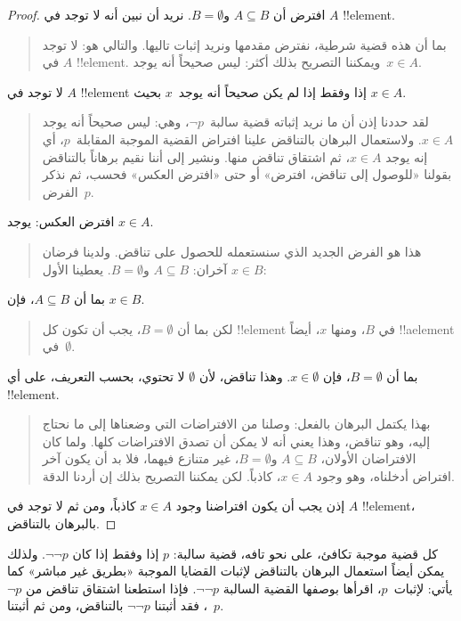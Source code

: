 \documentclass[../../../include/open-logic-section]{subfiles}
\begin{document}
\begin{proof}
  افترض أن $A \subseteq B$ و$B = \emptyset$. نريد أن نبين أنه لا توجد
  في $A$ !!{element}.
  \begin{quote}
    بما أن هذه قضية شرطية، نفترض مقدمها ونريد إثبات تاليها. والتالي هو:
    لا توجد في $A$ !!{element}. ويمكننا التصريح بذلك أكثر: ليس صحيحاً
    أنه يوجد~$x \in A$.
  \end{quote}
  لا توجد في $A$ !!{element} إذا وفقط إذا لم يكن صحيحاً أنه يوجد~$x$
  بحيث $x \in A$.
  \begin{quote}
    لقد حددنا إذن أن ما نريد إثباته قضية سالبة~$\lnot p$، وهي: ليس
    صحيحاً أنه يوجد $x \in A$. ولاستعمال البرهان بالتناقض علينا افتراض
    القضية الموجبة المقابلة~$p$، أي إنه يوجد $x \in A$، ثم اشتقاق
    تناقض منها. ونشير إلى أننا نقيم برهاناً بالتناقض بقولنا «للوصول إلى
    تناقض، افترض» أو حتى «افترض العكس» فحسب، ثم نذكر الفرض~$p$.
  \end{quote}
  افترض العكس: يوجد $x \in A$.
  \begin{quote}
    هذا هو الفرض الجديد الذي سنستعمله للحصول على تناقض. ولدينا فرضان
    آخران: $A \subseteq B$ و$B = \emptyset$. يعطينا الأول
    $x \in B$:
  \end{quote}
  بما أن $A \subseteq B$، فإن $x \in B$.
  \begin{quote}
    لكن بما أن $B = \emptyset$، يجب أن تكون كل !!{element} في $B$،
    ومنها $x$، أيضاً !!a{element} في~$\emptyset$.
  \end{quote}
  بما أن $B = \emptyset$، فإن $x \in \emptyset$. وهذا تناقض، لأن
  $\emptyset$ لا تحتوي، بحسب التعريف، على أي !!{element}.
  \begin{quote}
    بهذا يكتمل البرهان بالفعل: وصلنا من الافتراضات التي وضعناها إلى ما
    نحتاج إليه، وهو تناقض، وهذا يعني أنه لا يمكن أن تصدق الافتراضات كلها.
    ولما كان الافتراضان الأولان، $A \subseteq B$ و$B = \emptyset$، غير
    متنازع فيهما، فلا بد أن يكون آخر افتراض أدخلناه، وهو وجود
    $x \in A$، كاذباً. لكن يمكننا التصريح بذلك إن أردنا الدقة.
  \end{quote}
  إذن يجب أن يكون افتراضنا وجود $x \in A$ كاذباً، ومن ثم لا توجد في
  $A$ !!{element}، بالبرهان بالتناقض.
\end{proof}

كل قضية موجبة تكافئ، على نحو تافه، قضية سالبة: $p$ إذا وفقط إذا كان
$\lnot\lnot p$. ولذلك يمكن أيضاً استعمال البرهان بالتناقض لإثبات
القضايا الموجبة «بطريق غير مباشر» كما يأتي: لإثبات~$p$، اقرأها بوصفها
القضية السالبة $\lnot\lnot p$. فإذا استطعنا اشتقاق تناقض من
$\lnot p$، فقد أثبتنا $\lnot\lnot p$ بالتناقض، ومن ثم أثبتنا~$p$.
\end{document}
